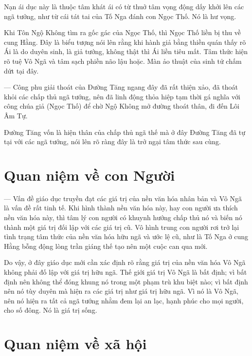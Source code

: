 Nạn ái dục này là thuộc tâm khát ái có từ thuở tâm vọng động dấy khởi lên các ngã tưởng, như từ cái tát tai của Tố Nga đánh con Ngọc Thố. Nó là hư vọng.

Khi Tôn Ngộ Không tìm ra gốc gác của Ngọc Thố, thì Ngọc Thố liền bị thu về cung Hằng. Đây là biểu tượng nói lên rằng khi hành giả bằng thiền quán thấy rõ Ái là do duyên sinh, là giả tướng, không thật thì Ái liền tiêu mất. Tâm thức hiện rõ tuệ Vô Ngã và tâm sạch phiền não lậu hoặc. Màn ảo thuật của sinh tử chấm dứt tại đây.

— Công phu giải thoát của Đường Tăng ngang đây đã rất thiện xảo, đã thoát khỏi các chấp thủ ngã tướng, nên đã linh động thỏa hiệp tạm thời gá nghĩa với công chúa giả (Ngọc Thố) để chờ Ngộ Không mở đường thoát thân, đi đến Lôi Âm Tự.

Đường Tăng vốn là hiện thân của chấp thủ ngã thế mà ở đây Đường Tăng đã tự tại với các ngã tướng, nói lên rõ ràng đây là trở ngại tâm thức sau cùng.

\section{Quan niệm về con Người} %
\label{sec:91_92_95_con_nguoi}

— Vấn đề giáo dục truyền đạt các giá trị của nền văn hóa nhân bản và Vô Ngã là vấn đề rất tinh tế. Khi hình thành nền văn hóa này, hay con người ưa thích nền văn hóa này, thì tâm lý con người có khuynh hướng chấp thủ nó và biến nó thành một giá trị đối lập với các giá trị cũ. Vô hình trung con người rơi trở lại tình trạng tâm thức của nền văn hóa hữu ngã và ước lệ cũ, như là Tố Nga ở cung Hằng bỗng động lòng trần giáng thế tạo nên một cuộc can qua mới.

Do vậy, ở đây giáo dục mới cần xác định rõ rằng giá trị của nền văn hóa Vô Ngã không phải đố lập với giá trị hữu ngã. Thế giới giá trị Vô Ngã là bất định; vì bất định nên không thể đóng khung nó trong một phạm trù khu biệt nào; vì bất định nên nó tùy duyên mà hiện ra các giá trị như giá trị hữu ngã. Vì nó là Vô Ngã, nên nó hiện ra tất cả ngã tướng nhằm đem lại an lạc, hạnh phúc cho mọi người, cho số đông. Nó là giá trị sống.

\section{Quan niệm về xã hội} %
\label{sec:91_92_95_xa_hoi}

